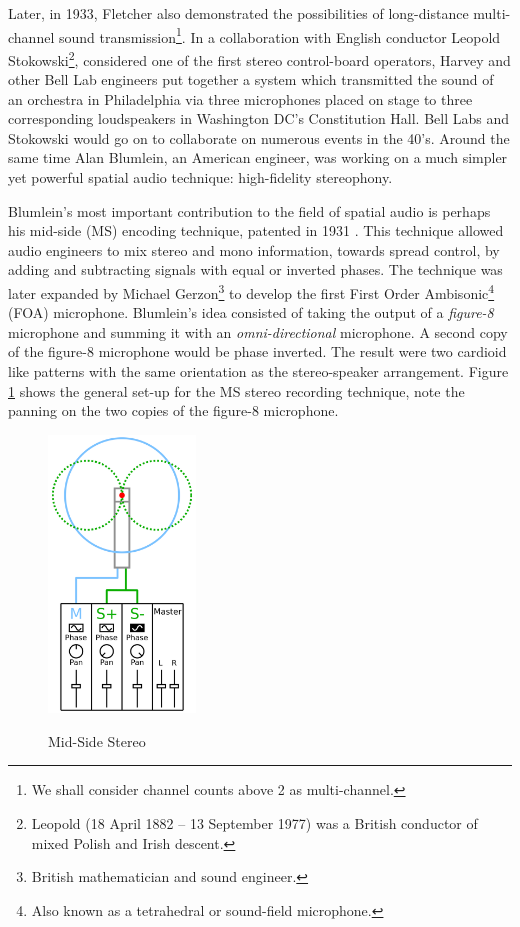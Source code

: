 Later, in 1933, Fletcher also demonstrated the possibilities of long-distance multi-channel sound transmission\footnote{We shall consider channel counts above 2 as multi-channel.}. In a collaboration with English conductor Leopold Stokowski\footnote{Leopold (18 April 1882 – 13 September 1977) was a British conductor of mixed Polish and Irish descent.}, considered one of the first stereo control-board operators\cite{mcginn1983stokowski}, Harvey and other Bell Lab engineers put together a system which transmitted the sound of an orchestra in Philadelphia via three microphones placed on stage to three corresponding loudspeakers in Washington DC's Constitution Hall. Bell Labs and Stokowski would go on to collaborate on numerous events in the 40's. Around the same time Alan Blumlein, an American engineer, was working on a much simpler yet powerful spatial audio technique: high-fidelity stereophony. 

Blumlein's most important contribution to the field of spatial audio is perhaps his mid-side (MS) encoding technique, patented in 1931 \cite{billingsley1987simulated}. This technique allowed audio engineers to mix stereo and mono information, towards spread control, by adding and subtracting signals with equal or inverted phases. The technique was later expanded by Michael Gerzon\footnote{British mathematician and sound engineer.} to develop the first First Order Ambisonic\footnote{Also known as a tetrahedral or sound-field microphone.} (FOA) microphone. Blumlein's idea consisted of taking the output of a \textit{figure-8} microphone and summing it with an \textit{omni-directional} microphone. A second copy of the figure-8 microphone would be phase inverted. The result were two cardioid like patterns with the same orientation as the stereo-speaker arrangement. Figure \ref{fig:ms_stereo} shows the general set-up for the MS stereo recording technique, note the panning on the two copies of the figure-8 microphone. 

\begin{figure}[h!]%
\centering
\includegraphics[width=0.35\textwidth]{img/ms_stereo.svg.png} 
\label{fig:ms_stereo}
\caption{Mid-Side Stereo \cite{ms_stereo_pic}}
\end{figure}

